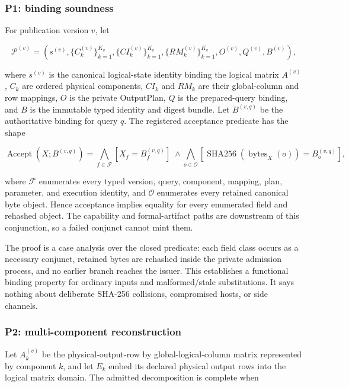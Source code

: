 \subsubsection{P1: binding soundness}\label{p1-binding-soundness}

For publication version \(v\), let

\[
\mathcal{P}^{(v)}=
\left(
s^{(v)},
\{C_k^{(v)}\}_{k=1}^{K_v},
\{CI_k^{(v)}\}_{k=1}^{K_v},
\{RM_k^{(v)}\}_{k=1}^{K_v},
O^{(v)},Q^{(v)},B^{(v)}
\right),
\]

where \(s^{(v)}\) is the canonical logical-state identity binding the logical matrix \(A^{(v)}\), \(C_k\) are ordered physical components, \(CI_k\) and \(RM_k\) are their global-column and row mappings, \(O\) is the private OutputPlan, \(Q\) is the prepared-query binding, and \(B\) is the immutable typed identity and digest bundle. Let \(B^{(v,q)}\) be the authoritative binding for query \(q\). The registered acceptance predicate has the shape

\[
\operatorname{Accept}(X;B^{(v,q)})=
\bigwedge_{f\in\mathcal{F}}[X_f=B_f^{(v,q)}]
\;\land\!
\bigwedge_{o\in\mathcal{O}}
[\operatorname{SHA256}(\operatorname{bytes}_X(o))=B_o^{(v,q)}],
\]

where \(\mathcal{F}\) enumerates every typed version, query, component, mapping, plan, parameter, and execution identity, and \(\mathcal{O}\) enumerates every retained canonical byte object. Hence acceptance implies equality for every enumerated field and rehashed object. The capability and formal-artifact paths are downstream of this conjunction, so a failed conjunct cannot mint them.

The proof is a case analysis over the closed predicate: each field class occurs as a necessary conjunct, retained bytes are rehashed inside the private admission process, and no earlier branch reaches the issuer. This establishes a functional binding property for ordinary inputs and malformed/stale substitutions. It says nothing about deliberate SHA-256 collisions, compromised hosts, or side channels.

\subsubsection{P2: multi-component reconstruction}\label{p2-multi-component-reconstruction}

Let \(A_k^{(v)}\) be the physical-output-row by global-logical-column matrix represented by component \(k\), and let \(E_k\) embed its declared physical output rows into the logical matrix domain. The admitted decomposition is complete when

